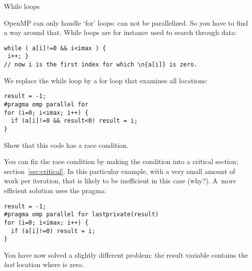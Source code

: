  {While loops}

OpenMP can only handle `for' loops:  can not
be parallelized. So you have to find a way around that. While loops
are for instance used to search through data:
\begin{verbatim}
while ( a[i]!=0 && i<imax ) {
 i++; }
// now i is the first index for which \n{a[i]} is zero.
\end{verbatim}
We replace the while loop by a for loop that examines all locations:
\begin{verbatim}
result = -1;
#pragma omp parallel for
for (i=0; i<imax; i++) {
  if (a[i]!=0 && result<0) result = i;
}
\end{verbatim}
\begin{exercise}
  Show that this code has a race condition.
\end{exercise}
You can fix the race condition by making the condition into a critical section;
section~\ref{sec:critical}. In this particular example, with a very small amount
of work per iteration, that is likely to be inefficient 
in this case (why?).
A~more efficient solution uses the  pragma:
\begin{verbatim}
result = -1;
#pragma omp parallel for lastprivate(result)
for (i=0; i<imax; i++) {
  if (a[i]!=0) result = i;
}
\end{verbatim}
You have now solved a slightly different problem: the result variable
contains the \emph{last} location where  is zero.


